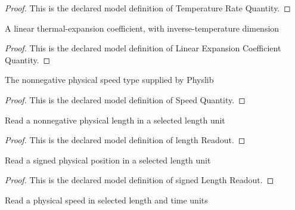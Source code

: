 \begin{proof}
  This is the declared model definition of Temperature Rate Quantity.
\end{proof}
\begin{definition}
  \label{def:physics:phyx-mini-0156:phyxminiproblems-problemphyxmini0156-linearexpansioncoefficientquantity}
  A linear thermal-expansion coefficient, with inverse-temperature dimension
\end{definition}
\begin{proof}
  This is the declared model definition of Linear Expansion Coefficient Quantity.
\end{proof}
\begin{definition}
  \label{def:physics:phyx-mini-0156:phyxminiproblems-problemphyxmini0156-speedquantity}
  The nonnegative physical speed type supplied by Physlib
\end{definition}
\begin{proof}
  This is the declared model definition of Speed Quantity.
\end{proof}
\begin{definition}
  \label{def:physics:phyx-mini-0156:phyxminiproblems-problemphyxmini0156-lengthreadout}
  Read a nonnegative physical length in a selected length unit
\end{definition}
\begin{proof}
  This is the declared model definition of length Readout.
\end{proof}
\begin{definition}
  \label{def:physics:phyx-mini-0156:phyxminiproblems-problemphyxmini0156-signedlengthreadout}
  Read a signed physical position in a selected length unit
\end{definition}
\begin{proof}
  This is the declared model definition of signed Length Readout.
\end{proof}
\begin{definition}
  \label{def:physics:phyx-mini-0156:phyxminiproblems-problemphyxmini0156-speedreadout}
  Read a physical speed in selected length and time units
\end{definition}
